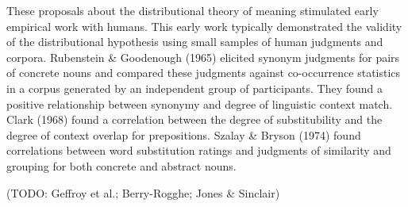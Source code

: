 \documentclass[man,floatsintext]{apa6}
\begin{document}
These proposals about the distributional theory of meaning stimulated early empirical work with humans. This early work typically demonstrated the validity of the distributional hypothesis using small samples of human judgments and corpora. Rubenstein \& Goodenough (1965) elicited synonym judgments for pairs of concrete nouns and compared these judgments against co-occurrence statistics in a corpus generated by an independent group of participants. They found a positive relationship between synonymy and degree of linguistic context match. Clark (1968) found a correlation between the degree of substitubility and the degree of context overlap for prepositions. Szalay \& Bryson (1974) found correlations between word substitution ratings and judgments of similarity and grouping for both concrete and abstract nouns.

(TODO: Geffroy et al.; Berry-Rogghe; Jones \& Sinclair)





\end{document}
